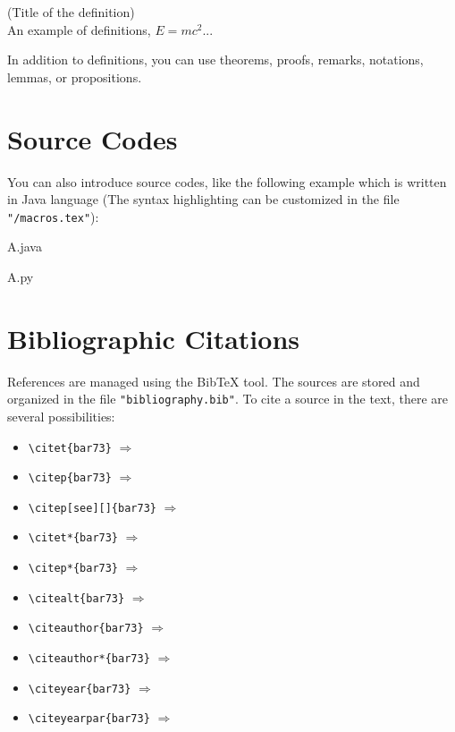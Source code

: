 \begin{definition} \label{def:example}
	(Title of the definition)\\
	An example of definitions, $E=mc^2$...
\end{definition}

In addition to definitions, you can use theorems, proofs, remarks, notations, lemmas, or propositions.

\section{Source Codes}

You can also introduce source codes, like the following example which is written in Java language (The syntax highlighting can be customized in the file \texttt{"/macros.tex"}):

\begin{sourcecode}{A.java}
	
\end{sourcecode}
\begin{sourcecode}{A.py}
	
\end{sourcecode}

\section{Bibliographic Citations}

References are managed using the Bib\TeX{} tool. The sources are stored and organized in the file \texttt{"bibliography.bib"}. To cite a source in the text, there are several possibilities:

\begin{itemize}
	\item \verb|\citet{bar73}| \quad $\Rightarrow$ \quad \citet{bar73} %
		\item \verb|\citep{bar73}| \quad $\Rightarrow$ \quad \citep{bar73} %
	\item \verb|\citep[see][]{bar73}| \quad $\Rightarrow$ \quad \citep[see][]{bar73} %
	\item \verb|\citet*{bar73}| \quad $\Rightarrow$ \quad \citet*{bar73} %
	\item \verb|\citep*{bar73}| \quad $\Rightarrow$ \quad \citep*{bar73} %
	\item \verb|\citealt{bar73}| \quad $\Rightarrow$ \quad \citealt{bar73} %
	\item \verb|\citeauthor{bar73}| \quad $\Rightarrow$ \quad \citeauthor{bar73} %
	\item \verb|\citeauthor*{bar73}| \quad $\Rightarrow$ \quad \citeauthor*{bar73} %
	\item \verb|\citeyear{bar73}| \quad $\Rightarrow$ \quad \citeyear{bar73} %
	\item \verb|\citeyearpar{bar73}| \quad $\Rightarrow$ \quad \citeyearpar{bar73} %
\end{itemize}